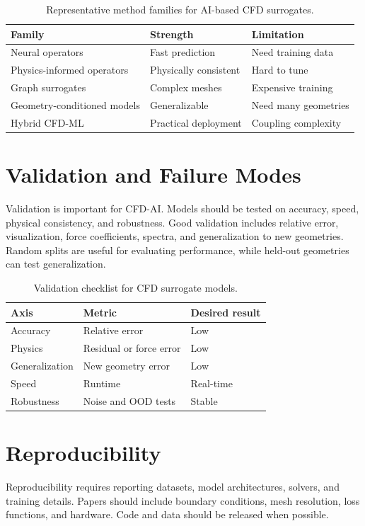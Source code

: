 \documentclass[11pt]{article}
\begin{document}
\begin{table}[t]
\centering
\caption{Representative method families for AI-based CFD surrogates.}
\begin{tabular}{lll}
\toprule
Family & Strength & Limitation \\
\midrule
Neural operators & Fast prediction & Need training data \\
Physics-informed operators & Physically consistent & Hard to tune \\
Graph surrogates & Complex meshes & Expensive training \\
Geometry-conditioned models & Generalizable & Need many geometries \\
Hybrid CFD-ML & Practical deployment & Coupling complexity \\
\bottomrule
\end{tabular}
\end{table}

\section{Validation and Failure Modes}
Validation is important for CFD-AI. Models should be tested on accuracy, speed, physical consistency, and robustness. Good validation includes relative error, visualization, force coefficients, spectra, and generalization to new geometries. Random splits are useful for evaluating performance, while held-out geometries can test generalization.

\begin{table}[t]
\centering
\caption{Validation checklist for CFD surrogate models.}
\begin{tabular}{lll}
\toprule
Axis & Metric & Desired result \\
\midrule
Accuracy & Relative error & Low \\
Physics & Residual or force error & Low \\
Generalization & New geometry error & Low \\
Speed & Runtime & Real-time \\
Robustness & Noise and OOD tests & Stable \\
\bottomrule
\end{tabular}
\end{table}

\section{Reproducibility}
Reproducibility requires reporting datasets, model architectures, solvers, and training details. Papers should include boundary conditions, mesh resolution, loss functions, and hardware. Code and data should be released when possible.
\end{document}
